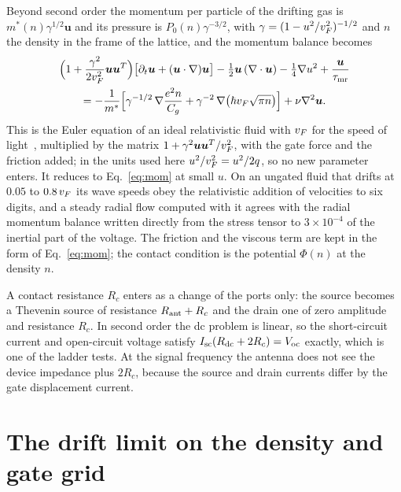 Beyond second order the momentum per particle of the drifting gas is
$m^{*}(n)\gamma^{1/2}\bm{u}$ and its pressure is
$P_{0}(n)\gamma^{-3/2}$, with $\gamma=(1-u^{2}/v_{F}^{2})^{-1/2}$ and $n$ the
density in the frame of the lattice, and the momentum balance becomes
\begin{multline}
\Bigl(1+\frac{\gamma^{2}}{2v_{F}^{2}}\bm{u}\bm{u}^{T}\Bigr)
\bigl[\partial_{t}\bm{u}+(\bm{u}\cdot\nabla)\bm{u}\bigr]
-\tfrac12\bm{u}\,(\nabla\cdot\bm{u})-\tfrac14\nabla u^{2}
+\frac{\bm{u}}{\tau_{\mathrm{mr}}}\\
=-\frac{1}{m^{*}}\Bigl[\gamma^{-1/2}\,\nabla\frac{e^{2}n}{C_{g}}
+\gamma^{-2}\,\nabla\bigl(\hbar v_{F}\sqrt{\pi n}\bigr)\Bigr]
+\nu\nabla^{2}\bm{u}.
\label{eq:exact}
\end{multline}
This is the Euler equation of an ideal relativistic fluid with $v_{F}$ for
the speed of light~\cite{landau1987fluid}, multiplied by the matrix
$1+\gamma^{2}\bm{u}\bm{u}^{T}/v_{F}^{2}$, with the gate force and the
friction added; in the units used here $u^{2}/v_{F}^{2}=u^{2}/2q$, so no new
parameter enters. It reduces to Eq.~\eqref{eq:mom} at small $u$. On an
ungated fluid that drifts at $0.05$ to $0.8\,v_{F}$ its wave speeds obey
the relativistic addition of velocities to six digits, and a steady
radial flow computed with it agrees with the radial momentum balance
written directly from the stress tensor to $3\times10^{-4}$ of the
inertial part of the voltage. The friction and the viscous term are kept
in the form of Eq.~\eqref{eq:mom}; the contact condition is the potential
$\Phi(n)$ at the density $n$.

A contact resistance $R_{c}$ enters as a change of the ports only: the
source becomes a Thevenin source of resistance $R_{\mathrm{ant}}+R_{c}$ and the drain
one of zero amplitude and resistance $R_{c}$. In second order the dc
problem is linear, so the short-circuit current and open-circuit voltage
satisfy $I_{\mathrm{sc}}(R_{\mathrm{dc}}+2R_{c})=V_{\mathrm{oc}}$ exactly, which is
one of the ladder tests. At the signal frequency the antenna does not see
the device impedance plus $2R_{c}$, because the source and drain currents
differ by the gate displacement current.

\section{The drift limit on the density and gate grid}
\label{app:knee}

